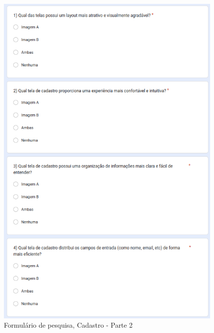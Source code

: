 \begin{figure}[!h]
	\begin{center}
	    \includegraphics[scale=0.6]{figs/Form/10.png}
	\end{center}
	\caption{\label{AP_CP02}Formulário de pesquisa, Cadastro - Parte 2}
\end{figure}

\newpage

